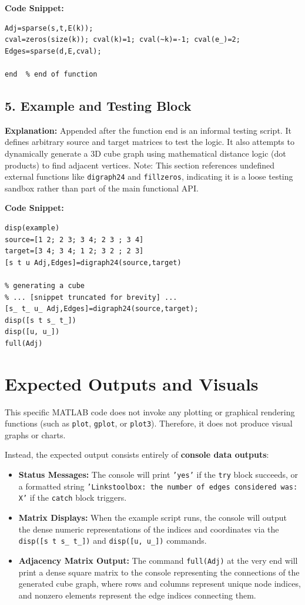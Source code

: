 \textbf{Code Snippet:}
\begin{lstlisting}
Adj=sparse(s,t,E(k));
cval=zeros(size(k)); cval(k)=1; cval(~k)=-1; cval(e_)=2;
Edges=sparse(d,E,cval);

end  % end of function
\end{lstlisting}

\subsection{5. Example and Testing Block}
\textbf{Explanation:}
Appended after the function end is an informal testing script. It defines arbitrary source and target matrices to test the logic. It also attempts to dynamically generate a 3D cube graph using mathematical distance logic (dot products) to find adjacent vertices. Note: This section references undefined external functions like \texttt{digraph24} and \texttt{fillzeros}, indicating it is a loose testing sandbox rather than part of the main functional API.

\textbf{Code Snippet:}
\begin{lstlisting}
disp(example)
source=[1 2; 2 3; 3 4; 2 3 ; 3 4]
target=[3 4; 3 4; 1 2; 3 2 ; 2 3]
[s t u Adj,Edges]=digraph24(source,target)

% generating a cube
% ... [snippet truncated for brevity] ...
[s_ t_ u_ Adj,Edges]=digraph24(source,target);
disp([s t s_ t_])
disp([u, u_])
full(Adj)
\end{lstlisting}

\section{Expected Outputs and Visuals}

This specific MATLAB code does not invoke any plotting or graphical rendering functions (such as \texttt{plot}, \texttt{gplot}, or \texttt{plot3}). Therefore, it does not produce visual graphs or charts.

Instead, the expected output consists entirely of \textbf{console data outputs}:
\begin{itemize}
\item \textbf{Status Messages:} The console will print \texttt{'yes'} if the \texttt{try} block succeeds, or a formatted string \texttt{'Linkstoolbox: the number of edges considered was: X'} if the \texttt{catch} block triggers.
\item \textbf{Matrix Displays:} When the example script runs, the console will output the dense numeric representations of the indices and coordinates via the \texttt{disp([s t s\_ t\_])} and \texttt{disp([u, u\_])} commands.
\item \textbf{Adjacency Matrix Output:} The command \texttt{full(Adj)} at the very end will print a dense square matrix to the console representing the connections of the generated cube graph, where rows and columns represent unique node indices, and nonzero elements represent the edge indices connecting them.
\end{itemize}
